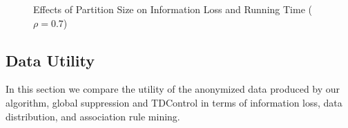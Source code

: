 
\begin{figure}[th]
\flushleft
{}
\caption{Effects of Partition Size on Information Loss and Running Time 
($\rho = 0.7$)}\label{fig:timebound}
\end{figure}
\subsection{Data Utility}\label{sec:eval:datautility}
In this section we compare the utility of the anonymized data produced by
our algorithm, global suppression and TDControl in terms of information loss,
data distribution, and association rule mining.

